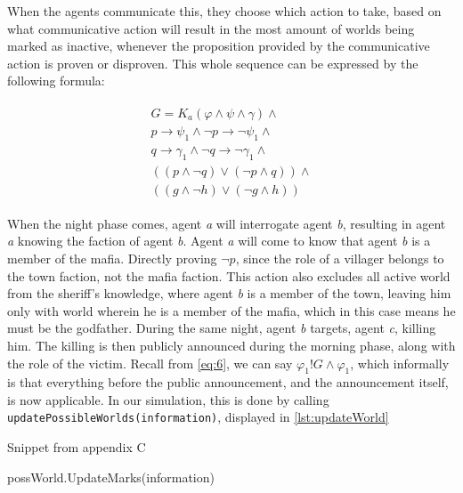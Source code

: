 When the agents communicate this, they choose which action to take, based on
what communicative action will result in the most amount of worlds being marked
as inactive, whenever the proposition provided by the communicative action is
proven or disproven. This whole sequence can be
expressed by the following formula:

\begin{align}
	\begin{split}
		G = K_a(\varphi \land \psi \land\gamma)\land                        \\
		p \rightarrow \psi_1 \land \neg p \rightarrow \neg \psi_1 \land     \\
		q \rightarrow \gamma_1 \land \neg q \rightarrow \neg \gamma_1 \land \\
		((p \land \neg q) \lor (\neg p \land q)) \land                      \\
		((g \land \neg h) \lor (\neg g \land h))
		\label{eq:7}
	\end{split}
\end{align}

When the night phase comes, agent \textit{a} will interrogate agent \textit{b},
resulting in agent \textit{a} knowing the faction of agent \textit{b}. Agent
\textit{a} will come to know that agent \textit{b} is a member of the mafia.
Directly proving $\neg p$, since the role of a villager belongs to the town
faction, not the mafia faction. This action also excludes all active world from
the sheriff's knowledge, where agent \textit{b} is a member of the town,
leaving him only with world wherein he is a member of the mafia, which in this
case means he must be the godfather. During the same night, agent \textit{b}
targets, agent \textit{c}, killing him. The killing is then publicly announced
during the morning phase, along with the role of the victim. Recall from
\cref{eq:6}, we can say $\varphi_1!G\land\varphi_1$, which informally is that
everything before the public announcement, and the announcement itself, is now
applicable. In our simulation, this is done by calling
\lstinline[]{updatePossibleWorlds(information)}, displayed in
\ref{lst:updateWorld}

\begin{algorithm}[h]
	\caption{Snippet from appendix C}
	\begin{algorithmic}[1]
		\State possWorld.UpdateMarks(information)
		\EndFor
		\EndFor
		\EndFunction
	\end{algorithmic}
\end{algorithm}\label{lst:updateWorld}

